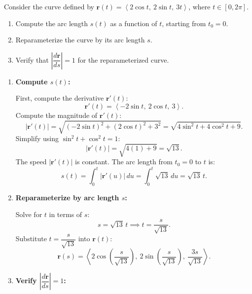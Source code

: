\exampleline
\begin{example}
Consider the curve defined by \( \mathbf{r}(t) = \left\langle 2\cos t,\ 2\sin t,\ 3t \right\rangle \), where \( t \in [0, 2\pi] \).
\begin{enumerate}
    \item Compute the arc length \( s(t) \) as a function of \( t \), starting from \( t_0 = 0 \).
    \item Reparameterize the curve by its arc length \( s \).
    \item Verify that \( \left| \dfrac{d\mathbf{r}}{ds} \right| = 1 \) for the reparameterized curve.
\end{enumerate}
\begin{solution}
\begin{enumerate}
    \item \textbf{Compute \( s(t) \):}
    
    First, compute the derivative \( \mathbf{r}'(t) \):
    \[
    \mathbf{r}'(t) = \left\langle -2\sin t,\ 2\cos t,\ 3 \right\rangle.
    \]
    Compute the magnitude of \( \mathbf{r}'(t) \):
    \[
    \left| \mathbf{r}'(t) \right| = \sqrt{ (-2\sin t)^2 + (2\cos t)^2 + 3^2 } = \sqrt{ 4\sin^2 t + 4\cos^2 t + 9 }.
    \]
    Simplify using \( \sin^2 t + \cos^2 t = 1 \):
    \[
    \left| \mathbf{r}'(t) \right| = \sqrt{ 4(1) + 9 } = \sqrt{13}.
    \]
    The speed \( \left| \mathbf{r}'(t) \right| \) is constant. The arc length from \( t_0 = 0 \) to \( t \) is:
    \[
    s(t) = \int_{0}^{t} \left| \mathbf{r}'(u) \right| \, du = \int_{0}^{t} \sqrt{13} \, du = \sqrt{13}\, t.
    \]
    
    \item \textbf{Reparameterize by arc length \( s \):}
    
    Solve for \( t \) in terms of \( s \):
    \[
    s = \sqrt{13}\, t \implies t = \dfrac{s}{\sqrt{13}}.
    \]
    Substitute \( t = \dfrac{s}{\sqrt{13}} \) into \( \mathbf{r}(t) \):
    \[
    \mathbf{r}(s) = \left\langle 2\cos\left( \dfrac{s}{\sqrt{13}} \right),\ 2\sin\left( \dfrac{s}{\sqrt{13}} \right),\ \dfrac{3s}{\sqrt{13}} \right\rangle.
    \]
    
    \item \textbf{Verify \( \left| \dfrac{d\mathbf{r}}{ds} \right| = 1 \):}
    

\end{enumerate}
\end{solution}
\end{example}
